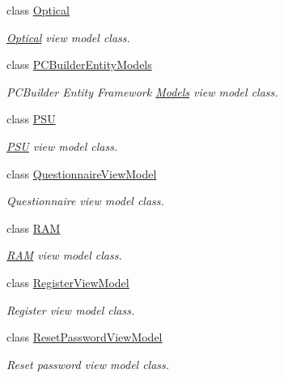 \begin{DoxyCompactItemize}
class \hyperlink{class_p_c_builder_m_v_c_1_1_models_1_1_optical}{Optical}
\begin{DoxyCompactList}\small\item\em \hyperlink{class_p_c_builder_m_v_c_1_1_models_1_1_optical}{Optical} view model class. \end{DoxyCompactList}\item 
class \hyperlink{class_p_c_builder_m_v_c_1_1_models_1_1_p_c_builder_entity_models}{P\+C\+Builder\+Entity\+Models}
\begin{DoxyCompactList}\small\item\em P\+C\+Builder Entity Framework \hyperlink{namespace_p_c_builder_m_v_c_1_1_models}{Models} view model class. \end{DoxyCompactList}\item 
class \hyperlink{class_p_c_builder_m_v_c_1_1_models_1_1_p_s_u}{P\+SU}
\begin{DoxyCompactList}\small\item\em \hyperlink{class_p_c_builder_m_v_c_1_1_models_1_1_p_s_u}{P\+SU} view model class. \end{DoxyCompactList}\item 
class \hyperlink{class_p_c_builder_m_v_c_1_1_models_1_1_questionnaire_view_model}{Questionnaire\+View\+Model}
\begin{DoxyCompactList}\small\item\em Questionnaire view model class. \end{DoxyCompactList}\item 
class \hyperlink{class_p_c_builder_m_v_c_1_1_models_1_1_r_a_m}{R\+AM}
\begin{DoxyCompactList}\small\item\em \hyperlink{class_p_c_builder_m_v_c_1_1_models_1_1_r_a_m}{R\+AM} view model class. \end{DoxyCompactList}\item 
class \hyperlink{class_p_c_builder_m_v_c_1_1_models_1_1_register_view_model}{Register\+View\+Model}
\begin{DoxyCompactList}\small\item\em Register view model class. \end{DoxyCompactList}\item 
class \hyperlink{class_p_c_builder_m_v_c_1_1_models_1_1_reset_password_view_model}{Reset\+Password\+View\+Model}
\begin{DoxyCompactList}\small\item\em Reset password view model class. \end{DoxyCompactList}\item 

\end{DoxyCompactItemize}
